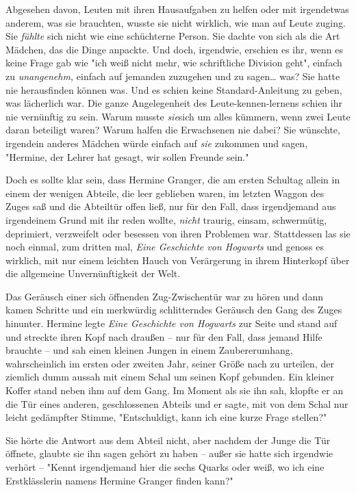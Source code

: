 {Abgesehen davon, Leuten mit ihren Hausaufgaben zu helfen oder mit irgendetwas anderem, was sie brauchten, wusste sie nicht wirklich, wie man auf Leute zuging. Sie \emph{fühlte} sich nicht wie eine schüchterne Person. Sie dachte von sich als die Art Mädchen, das die Dinge anpackte. Und doch, irgendwie, erschien es ihr, wenn es keine Frage gab wie "ich weiß nicht mehr, wie schriftliche Division geht", einfach zu \emph{unangenehm,} einfach auf jemanden zuzugehen und zu sagen… was? Sie hatte nie herausfinden können was. Und es schien keine Standard-Anleitung zu geben, was lächerlich war. Die ganze Angelegenheit des Leute-kennen-lernens schien ihr nie vernünftig zu sein. Warum musste \emph{sie}sich um alles kümmern, wenn zwei Leute daran beteiligt waren? Warum halfen die Erwachsenen nie dabei? Sie wünschte, irgendein anderes Mädchen würde einfach auf \emph{sie} zukommen und sagen, "Hermine, der Lehrer hat gesagt, wir sollen Freunde sein."

Doch es sollte klar sein, dass Hermine Granger, die am ersten Schultag allein in einem der wenigen Abteile, die leer geblieben waren, im letzten Waggon des Zuges saß und die Abteiltür offen ließ, nur für den Fall, dass irgendjemand aus irgendeinem Grund mit ihr reden wollte, \emph{nicht} traurig, einsam, schwermütig, deprimiert, verzweifelt oder besessen von ihren Problemen war. Stattdessen las sie noch einmal, zum dritten mal, \emph{Eine Geschichte von Hogwarts} und genoss es wirklich, mit nur einem leichten Hauch von Verärgerung in ihrem Hinterkopf über die allgemeine Unvernünftigkeit der Welt.

Das Geräusch einer sich öffnenden Zug-Zwischentür war zu hören und dann kamen Schritte und ein merkwürdig schlitterndes Geräusch den Gang des Zuges hinunter. Hermine legte \emph{Eine Geschichte von Hogwarts} zur Seite und stand auf und streckte ihren Kopf nach draußen -- nur für den Fall, dass jemand Hilfe brauchte -- und sah einen kleinen Jungen in einem Zaubererumhang, wahrscheinlich im ersten oder zweiten Jahr, seiner Größe nach zu urteilen, der ziemlich dumm aussah mit einem Schal um seinen Kopf gebunden. Ein kleiner Koffer stand neben ihm auf dem Gang. Im Moment als sie ihn sah, klopfte er an die Tür eines anderen, geschlossenen Abteils und er sagte, mit von dem Schal nur leicht gedämpfter Stimme, "Entschuldigt, kann ich eine kurze Frage stellen?"

Sie hörte die Antwort aus dem Abteil nicht, aber nachdem der Junge die Tür öffnete, glaubte sie ihn sagen gehört zu haben -- außer sie hatte sich irgendwie verhört -- "Kennt irgendjemand hier die sechs Quarks oder weiß, wo ich eine Erstklässlerin namens Hermine Granger finden kann?"

}
